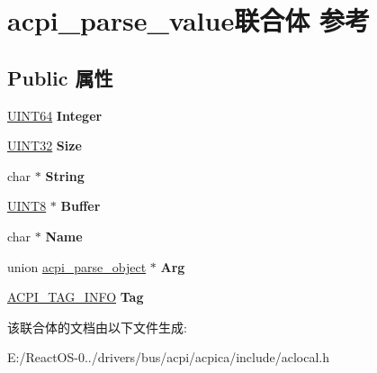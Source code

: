\hypertarget{unionacpi__parse__value}{}\section{acpi\+\_\+parse\+\_\+value联合体 参考}
\label{unionacpi__parse__value}
\subsection*{Public 属性}
\begin{DoxyCompactItemize}
\item 
\mbox{\label{unionacpi__parse__value_a9384daf1ab4c1aced7dda1c23802ac9a}} 
\hyperlink{_processor_bind_8h_a57be03562867144161c1bfee95ca8f7c}{U\+I\+N\+T64} {\bfseries Integer}
\item 
\mbox{\label{unionacpi__parse__value_af45c524526f9bd057475f61c9613c27a}} 
\hyperlink{_processor_bind_8h_ae1e6edbbc26d6fbc71a90190d0266018}{U\+I\+N\+T32} {\bfseries Size}
\item 
\mbox{\label{unionacpi__parse__value_a94924163a76141dc201b87d90f04de9d}} 
char $\ast$ {\bfseries String}
\item 
\mbox{\label{unionacpi__parse__value_a82a1a6744fc48584105ab82b711bdcc8}} 
\hyperlink{_processor_bind_8h_ab27e9918b538ce9d8ca692479b375b6a}{U\+I\+N\+T8} $\ast$ {\bfseries Buffer}
\item 
\mbox{\label{unionacpi__parse__value_a40bfac4a6d351e4ec6cc1b3e75b70cd6}} 
char $\ast$ {\bfseries Name}
\item 
\mbox{\label{unionacpi__parse__value_a6795c79a3365cef5d173cd14e7b0cf3d}} 
union \hyperlink{unionacpi__parse__object}{acpi\+\_\+parse\+\_\+object} $\ast$ {\bfseries Arg}
\item 
\mbox{\label{unionacpi__parse__value_adf210748bf3be4dc885f4496bc3a11ab}} 
\hyperlink{structacpi__tag__info}{A\+C\+P\+I\+\_\+\+T\+A\+G\+\_\+\+I\+N\+FO} {\bfseries Tag}
\end{DoxyCompactItemize}


该联合体的文档由以下文件生成\+:\begin{DoxyCompactItemize}
\item 
E\+:/\+React\+O\+S-\/0../drivers/bus/acpi/acpica/include/aclocal.\+h\end{DoxyCompactItemize}
